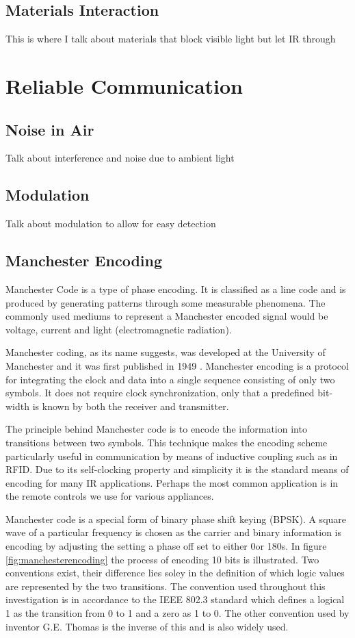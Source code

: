 \subsection{Materials Interaction}
This is where I talk about materials that block visible light but let IR through


\section{Reliable Communication}

\subsection{Noise in Air}
Talk about interference and noise due to ambient light

\subsection{Modulation}
Talk about modulation to allow for easy detection

\subsection{Manchester Encoding}
Manchester Code is a type of phase encoding. It is classified as a line code and is produced by generating patterns through some measurable phenomena. The commonly used mediums to represent a Manchester encoded signal would be voltage, current and light (electromagnetic radiation).

Manchester coding, as its name suggests, was developed at the University of Manchester and it was first published in 1949 \cite{Jameel2019}. Manchester encoding is a protocol for integrating the clock and data into a single sequence consisting of only two symbols. It does not require clock synchronization, only that a predefined bit-width is known by both the receiver and transmitter. 

The principle behind Manchester code is to encode the information into transitions between two symbols. This technique makes the encoding scheme particularly useful in communication by means of inductive coupling such as in RFID. Due to its self-clocking property and simplicity it is the standard means of encoding for many IR applications. Perhaps the most common application is in the remote controls we use for various appliances.

Manchester code is a special form of binary phase shift keying (BPSK). A square wave of a particular frequency is chosen as the carrier and binary information is encoding by adjusting the setting a phase off set to either 0\degree or 180\degree s. In figure \ref{fig:manchesterencoding} the process of encoding 10 bits is illustrated. Two conventions exist, their difference lies soley in the definition of which logic values are represented by the two transitions. The convention used throughout this investigation is in accordance to the IEEE 802.3 standard which defines a logical 1 as the transition from 0 to 1 and a zero as 1 to 0. The other convention used by inventor G.E. Thomas is the inverse of this and is also widely used.


